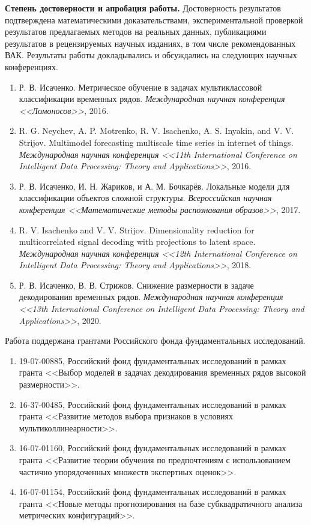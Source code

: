 \documentclass[11pt, a5paper]{dissert}
\begin{document}
\vspace{0.5cm}
\textbf{Степень достоверности и апробация работы.}
Достоверность результатов подтверждена математическими доказательствами, экспериментальной проверкой результатов предлагаемых методов на реальных данных, публикациями результатов в рецензируемых научных изданиях, в том числе рекомендованных ВАК. 
Результаты работы докладывались и обсуждались на следующих научных конференциях.
\begin{enumerate}
	\item Р. В. Исаченко. Метрическое обучение в задачах мультиклассовой классификации временных рядов. \textit{Международная научная конференция <<Ломоносов>>}, 2016.
	\item R. G. Neychev, A. P. Motrenko, R. V. Isachenko, A. S. Inyakin, and V. V. Strijov. Multimodel forecasting multiscale time series in internet of things. \textit{Международная научная конференция  <<11th International Conference on Intelligent Data Processing: Theory and Applications>>}, 2016.
	\item Р. В. Исаченко, И. Н. Жариков, и А. М. Бочкарёв. Локальные модели для классификации объектов сложной структуры. \textit{Всероссийская научная конференция <<Математические методы распознавания образов>>}, 2017.
	\item R. V. Isachenko and V. V. Strijov. Dimensionality reduction for multicorrelated signal decoding with projections to latent space. \textit{Международная научная конференция  <<12th International Conference on Intelligent Data Processing: Theory and Applications>>}, 2018.
	\item Р. В. Исаченко, В. В. Стрижов. Снижение размерности в задаче декодирования временных рядов. \textit{Международная научная конференция  <<13th International Conference on Intelligent Data Processing: Theory and Applications>>}, 2020.
\end{enumerate} 

Работа поддержана грантами Российского фонда фундаментальных исследований.
\begin{enumerate}
	\item 19-07-00885, Российский фонд фундаментальных исследований в рамках гранта <<Выбор моделей в задачах декодирования временных рядов высокой размерности>>.
	\item 16-37-00485, Российский фонд фундаментальных исследований в рамках гранта <<Развитие методов выбора признаков в условиях мультиколлинеарности>>.
	\item 16-07-01160, Российский фонд фундаментальных исследований в рамках гранта <<Развитие теории обучения по предпочтениям с использованием частично упорядоченных множеств экспертных оценок>>.
	\item 16-07-01154, Российский фонд фундаментальных исследований в рамках гранта <<Новые методы прогнозирования на базе субквадратичного анализа метрических конфигураций>>.
\end{enumerate}
\end{document}
